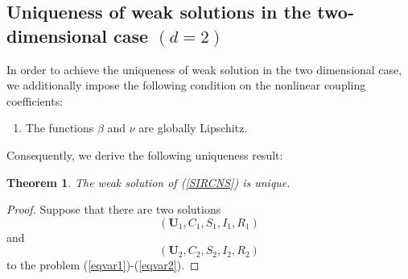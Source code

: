 \documentclass[10pt,number,preprint,times]{elsarticle}
\numberwithin{equation}{section} %
\newtheorem{thm}{Theorem}[section]
\begin{document}
\subsection{Uniqueness of weak solutions in the two-dimensional case $(d=2)$}
In order to achieve the uniqueness of weak solution in the two dimensional case, we additionally impose the following condition on the nonlinear coupling coefficients:
\begin{enumerate}
	\item[\textbf{(A4).}]  The functions $\beta$ and $\nu$ are globally Lipschitz.
\end{enumerate}
Consequently, we derive the following uniqueness result:
\begin{thm}
		The weak solution of (\ref{SIRCNS}) is unique.
\end{thm}
	\begin{proof}
		Suppose that there are two solutions $$(\boldsymbol{U}_1,  C_1, S_1, I_1, R_1)$$ and 
		$$(\boldsymbol{U}_2, C_2, S_2, I_2, R_2)$$ 
		to the problem (\ref{eqvar1})-(\ref{eqvar2}). 
		

\end{proof}
\end{document}

